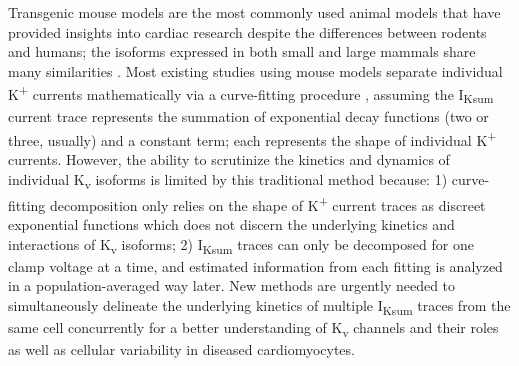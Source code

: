 \documentclass[11pt]{article}
\begin{document}
Transgenic mouse models are the most commonly used animal models that have provided insights into cardiac research despite the differences between rodents and humans; the isoforms expressed in both small and large mammals share many similarities \citep{milani2014small}. Most existing studies using mouse models separate individual K\textsuperscript{+} currents mathematically via a curve-fitting procedure \citep{costantini2005homeodomain,ednie2019reduced2,teng2022tmem65}, assuming the I\textsubscript{Ksum} current trace represents the summation of exponential decay functions (two or three, usually) and a constant term; each represents the shape of individual K\textsuperscript{+} currents. However, the ability to scrutinize the kinetics and dynamics of individual K\textsubscript{v} isoforms is limited by this traditional method because: 1) curve-fitting decomposition only relies on the shape of K\textsuperscript{+} current traces as discreet exponential functions which does not discern the underlying kinetics and interactions of K\textsubscript{v} isoforms; 2) I\textsubscript{Ksum} traces can only be decomposed for one clamp voltage at a time, and estimated information from each fitting is analyzed in a population-averaged way later. New methods are urgently needed to simultaneously delineate the underlying kinetics of multiple I\textsubscript{Ksum} traces from the same cell concurrently for a better understanding of K\textsubscript{v} channels and their roles as well as cellular variability in diseased cardiomyocytes.
\end{document}
